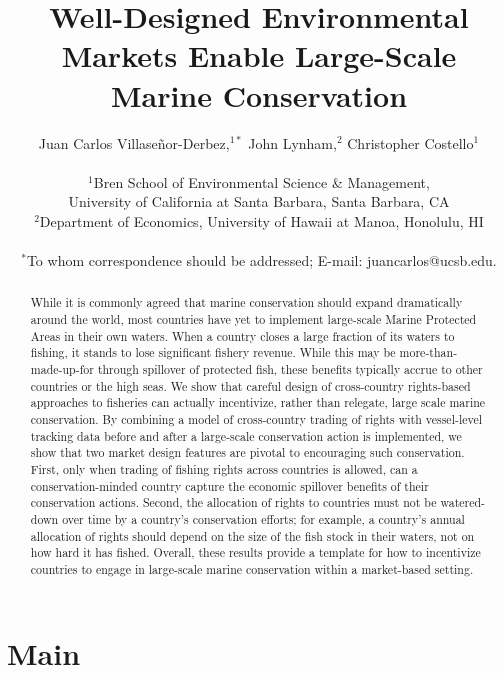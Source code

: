 \documentclass[12pt]{article}
\title{Well-Designed Environmental Markets Enable Large-Scale Marine Conservation}
\author{Juan Carlos Villase\~{n}or-Derbez,$^{1\ast}$ John Lynham,$^{2}$ Christopher Costello$^{1}$\\
\\
\normalsize{$^{1}$Bren School of Environmental Science \& Management,}\\
\normalsize{University of California at Santa Barbara, Santa Barbara, CA}\\
\normalsize{$^{2}$Department of Economics, University of Hawaii at Manoa, Honolulu, HI}\\
\\
\normalsize{$^\ast$To whom correspondence should be addressed; E-mail: juancarlos@ucsb.edu.}
}
\date{}
\begin{document}

\baselineskip24pt


\maketitle



\begin{abstract}
While it is commonly agreed that marine conservation should expand dramatically around the world, most countries have yet to implement large-scale Marine Protected Areas in their own waters. When a country closes a large fraction of its waters to fishing, it stands to lose significant fishery revenue. While this may be more-than-made-up-for through spillover of protected fish, these benefits typically accrue to other countries or the high seas. We show that careful design of cross-country rights-based approaches to fisheries can actually incentivize, rather than relegate, large scale marine conservation. By combining a model of cross-country trading of rights with vessel-level tracking data before and after a large-scale conservation action is implemented, we show that two market design features are pivotal to encouraging such conservation. First, only when trading of fishing rights across countries is allowed, can a conservation-minded country capture the economic spillover benefits of their conservation actions. Second, the allocation of rights to countries must not be watered-down over time by a country's conservation efforts; for example, a country's annual allocation of rights should depend on the size of the fish stock in their waters, not on how hard it has fished. Overall, these results provide a template for how to incentivize countries to engage in large-scale marine conservation within a market-based setting.
\end{abstract}

\clearpage

\section{Main}
\end{document}
